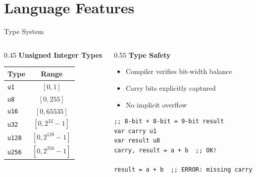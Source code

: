 \documentclass[aspectratio=169,11pt]{beamer}
\begin{document}
\section{Language Features}

\begin{frame}[fragile]{Type System}

\begin{columns}
\begin{column}{0.45\textwidth}
\textbf{Unsigned Integer Types}
\begin{table}
\centering
\small
\begin{tabular}{lc}
\toprule
Type & Range \\
\midrule
\texttt{u1} & $[0, 1]$ \\
\texttt{u8} & $[0, 255]$ \\
\texttt{u16} & $[0, 65535]$ \\
\texttt{u32} & $[0, 2^{32}-1]$ \\
\texttt{u128} & $[0, 2^{128}-1]$ \\
\texttt{u256} & $[0, 2^{256}-1]$ \\
\bottomrule
\end{tabular}
\end{table}
\end{column}

\begin{column}{0.55\textwidth}
\textbf{Type Safety}
\begin{itemize}
    \item Compiler verifies bit-width balance
    \item Carry bits explicitly captured
    \item No implicit overflow
\end{itemize}

\vspace{0.5em}
\begin{lstlisting}[style=zkasm]
;; 8-bit + 8-bit = 9-bit result
var carry u1
var result u8
carry, result = a + b  ;; OK!

result = a + b  ;; ERROR: missing carry
\end{lstlisting}
\end{column}
\end{columns}
\end{frame}
\end{document}
